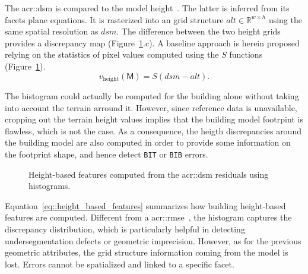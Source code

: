         The \gls{acr::dsm} is compared to the model height~\parencite{bredif20073d,zebedin2008fusion}.
        The latter is inferred from its facets plane equations.
        It is rasterized into an grid structure $alt \in \mathbb{R}^{w\times h}$ using the same spatial resolution as $dsm$.
        The difference between the two height grids provides a discrepancy map (Figure~\ref{fig::height_based_features}.c).
        A baseline approach is herein proposed relying on the statistics of pixel values computed using the $S$ functions (Figure~\ref{fig::height_based_features}).\\

        \begin{equation}
            \label{eq::height_based_features}
            v_{\text{height}}\left(\mathsf{M}\right) = S\left( dsm - alt \right).
        \end{equation}

        The histogram could actually be computed for the building alone without taking into account the terrain arround it.
        However, since reference data is unavailable, cropping out the terrain height values implies that the building model footrpint is flawless, which is not the case.
        As a consequence, the heigth discrepancies around the building model are also computed in order to provide some information on the footprint shape, and hence detect \texttt{BIT} or \texttt{BIB} errors.\\
        
        \begin{figure}[htpb]
            \centering
            
            \caption{
                \label{fig::height_based_features}
                Height-based features computed from the \gls{acr::dsm} residuals using histograms.
            }
        \end{figure}

        Equation~\ref{eq::height_based_features} summarizes how building height-based features are computed.
        Different from a \gls{acr::rmse}~\parencite{lafarge2012creating,poullis2013framework}, the histogram captures the discrepancy distribution, which is particularly helpful in detecting undersegmentation defects or geometric imprecision.
        However, as for the previous geometric attributes, the grid structure information coming from the model is lost.
        Errors cannot be spatialized and linked to a specific facet.

